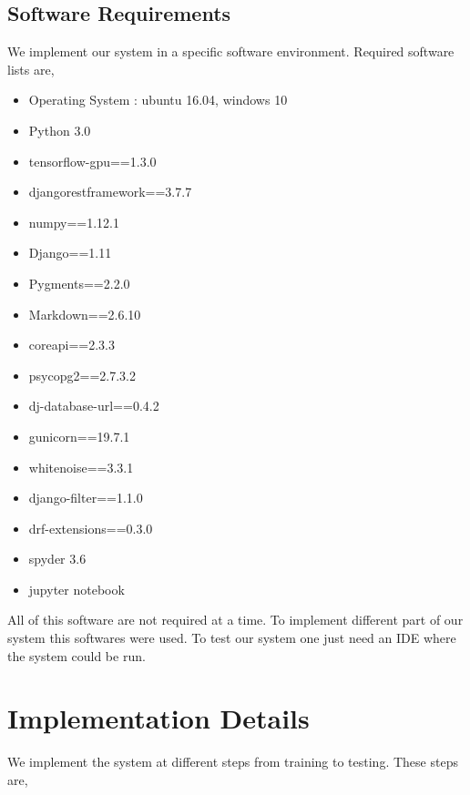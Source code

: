 \documentclass[12pt,a4paper]{report}
\begin{document}
\subsection{Software Requirements}
We implement our system in a specific software environment. Required software lists are,

\begin{itemize}
    \item Operating System : ubuntu 16.04, windows 10
    \item Python 3.0
    \item tensorflow-gpu==1.3.0
    \item djangorestframework==3.7.7
    \item numpy==1.12.1
    \item Django==1.11
    \item Pygments==2.2.0
    \item Markdown==2.6.10
    \item coreapi==2.3.3
    \item psycopg2==2.7.3.2
    \item dj-database-url==0.4.2
    \item gunicorn==19.7.1
    \item whitenoise==3.3.1
    \item django-filter==1.1.0
    \item drf-extensions==0.3.0
    \item spyder 3.6
    \item jupyter notebook
\end{itemize}
\par
\vspace{0.5cm}
\noindent
All of this software are not required at a time. To implement different part of our system this softwares were used. To test our system one just need an IDE where the system could be run.

\clearpage
\section{Implementation Details}
We implement the system at different steps from training to testing. These steps are,
\end{document}

